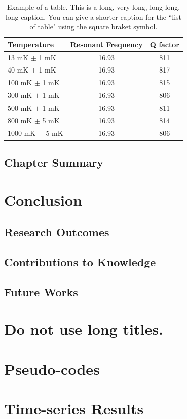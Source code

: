 \documentclass{utmthesis}
\begin{document}
\begin{table}[p]
\centering
\caption[Short version of the caption.]{Example of a table. This is a long, very long, long long, long caption.  You can give a shorter caption for the ``list of table" using the square braket symbol.}
\vspace{\baselineskip}
\begin{tabular}{l c c}
  \hline
  \hline
  Temperature & Resonant Frequency & Q factor\\
  \hline
  13 mK $\pm$ 1 mK & 16.93 & 811 \\
  40 mK $\pm$ 1 mK & 16.93 & 817 \\
  100 mK $\pm$ 1 mK & 16.93 & 815 \\
  300 mK $\pm$ 1 mK & 16.93 & 806\\
  500 mK $\pm$ 1 mK & 16.93 & 811\\
  800 mK $\pm$ 5 mK & 16.93 & 814\\
  1000 mK $\pm$ 5 mK & 16.93 & 806 \\
  \hline
  \hline
\end{tabular}
\end{table}

\section{Chapter Summary}


\chapter{Conclusion}
\section{Research Outcomes}
\section{Contributions to Knowledge}
\section{Future Works}






\appendix
\chapter{Do not use long titles.}

\chapter{Pseudo-codes}

\chapter{Time-series Results}

\endmatter
\end{document}
